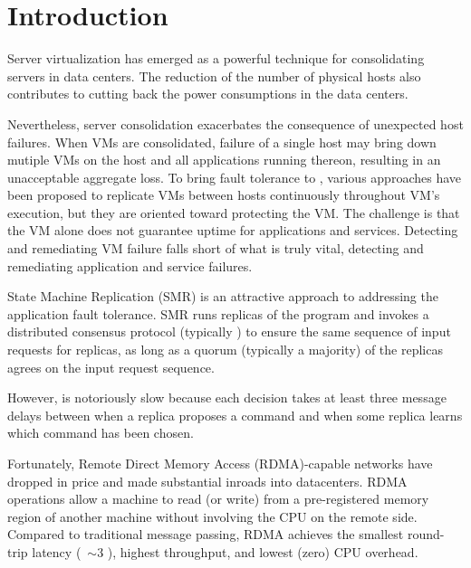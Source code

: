 \section{Introduction} \label{sec:intro}


Server virtualization has emerged as a powerful technique for consolidating servers in 
data centers. The reduction of the number of physical hosts also contributes to cutting 
back the power consumptions in the data centers.

Nevertheless, server consolidation exacerbates the consequence of unexpected host failures. 
When VMs are consolidated, failure of a single host may bring down mutiple VMs on the host 
and all applications running thereon, resulting in an unacceptable aggregate loss. 
To bring fault tolerance to , various approaches have been 
proposed to replicate VMs between hosts continuously throughout VM's execution, but they are
oriented toward protecting the VM. The challenge is that the VM alone does not guarantee uptime 
for applications and services. Detecting and remediating VM failure falls short of what is 
truly vital, detecting and remediating application and service failures.

State Machine Replication (SMR) is an attractive approach to addressing the application fault 
tolerance. SMR runs replicas of the program and invokes a distributed consensus protocol 
(typically \paxos) to ensure the same sequence of input requests for replicas, as long as a 
quorum (typically a majority) of the replicas agrees on the input request sequence.

However, \paxos is notoriously slow because each decision takes at least 
three message delays between when a replica proposes a command and when some replica learns which 
command has been chosen.

Fortunately, Remote Direct Memory Access (RDMA)-capable networks have dropped in price and made 
substantial inroads into datacenters. RDMA operations allow a machine to read (or write) from a 
pre-registered memory region of another machine without involving the CPU on the remote side. 
Compared to traditional message passing, RDMA achieves the smallest round-trip latency 
(~$\sim$3 \us), highest throughput, and lowest (zero) CPU overhead.


